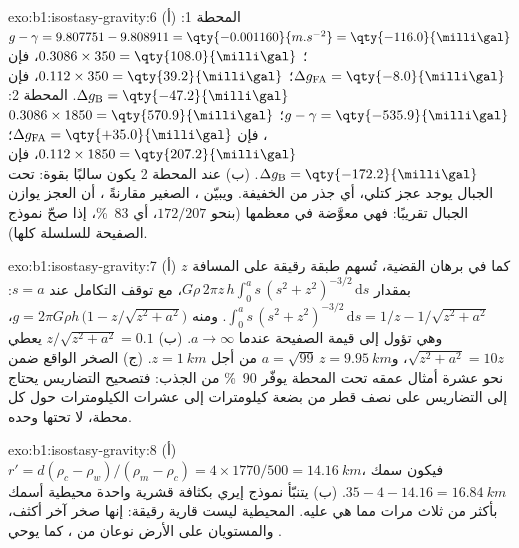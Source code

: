 \begin{solution}{exo:b1:isostasy-gravity:6}
(أ) المحطة 1: $g - \gamma = 9.807751 - 9.808911 = \qty{-0.001160}{m.s^{-2}} =
\qty{-116.0}{\milli\gal}$؛  $0.3086\times350 =
\qty{108.0}{\milli\gal}$، فإن $\Delta g_{\mathrm{FA}} = \qty{-8.0}{\milli\gal}$؛
 $0.112\times350 = \qty{39.2}{\milli\gal}$، فإن
$\Delta g_{\mathrm B} = \qty{-47.2}{\milli\gal}$.
المحطة 2: $g - \gamma = \qty{-535.9}{\milli\gal}$؛ 
$0.3086\times1850 = \qty{570.9}{\milli\gal}$، فإن $\Delta g_{\mathrm{FA}} =
\qty{+35.0}{\milli\gal}$؛  $0.112\times1850 =
\qty{207.2}{\milli\gal}$، فإن $\Delta g_{\mathrm B} = \qty{-172.2}{\milli\gal}$.
(ب) عند المحطة 2 يكون  سالبًا بقوة: تحت الجبال يوجد عجز كتلي، أي جذر من  الخفيفة. ويبيّن ، الصغير مقارنةً ، أن العجز يوازن الجبال تقريبًا: فهي معوَّضة في معظمها (بنحو $172/207$، أي \qty{83}{\percent}، إذا صحّ نموذج الصفيحة للسلسلة كلها).
\end{solution}

\begin{solution}{exo:b1:isostasy-gravity:7}
(أ) كما في برهان القضية، تُسهم طبقة رقيقة على المسافة $z$ بمقدار $G\rho\,2\pi z\,h\int_0^a s\,(s^2 + z^2)^{-3/2}\,\mathrm ds$، مع توقف التكامل عند $s = a$:
$\int_0^a s\,(s^2 + z^2)^{-3/2}\,\mathrm ds = 1/z - 1/\sqrt{z^2 + a^2}$. ومنه
$g = 2\pi G\rho h\,\bigl(1 - z/\sqrt{z^2 + a^2}\bigr)$، وهي تؤول إلى قيمة الصفيحة عندما $a \to \infty$. (ب) $z/\sqrt{z^2 + a^2} = 0.1$ يعطي
$\sqrt{z^2 + a^2} = 10z$، و$a = \sqrt{99}\,z = \qty{9.95}{km}$ من أجل
$z = \qty{1}{km}$. (ج) الصخر الواقع ضمن نحو عشرة أمثال عمقه تحت المحطة يوفّر \qty{90}{\percent} من الجذب: فتصحيح التضاريس يحتاج إلى التضاريس على نصف قطر من بضعة كيلومترات إلى عشرات الكيلومترات حول كل محطة، لا تحتها وحده.
\end{solution}

\begin{solution}{exo:b1:isostasy-gravity:8}
(أ) $r' = d(\rho_c - \rho_w)/(\rho_m - \rho_c) = 4\times1770/500 =
\qty{14.16}{km}$، فيكون سمك  $35 - 4 - 14.16 = \qty{16.84}{km}$.
(ب) يتنبّأ نموذج إيري بكثافة قشرية واحدة  محيطية أسمك بأكثر من ثلاث مرات مما هي عليه.  المحيطية ليست  قارية رقيقة: إنها صخر آخر أكثف، والمستويان على الأرض نوعان من ، كما يوحي .
\end{solution}

